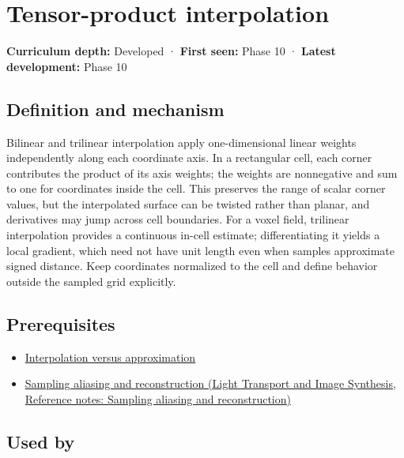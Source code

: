 \hypertarget{appendix-0a09b6dfdc86}{}\label{referencestart:appendix-0a09b6dfdc86}
\section{Tensor-product interpolation}\label{appendix-0a09b6dfdc86-tensor-product-interpolation}

\textbf{Curriculum depth:} Developed · \textbf{First seen:} Phase 10 · \textbf{Latest development:} Phase 10

\subsection{Definition and mechanism}\label{appendix-0a09b6dfdc86-definition-and-mechanism}

Bilinear and trilinear interpolation apply one-dimensional linear weights independently along each coordinate axis. In a rectangular cell, each corner contributes the product of its axis weights; the weights are nonnegative and sum to one for coordinates inside the cell. This preserves the range of scalar corner values, but the interpolated surface can be twisted rather than planar, and derivatives may jump across cell boundaries. For a voxel field, trilinear interpolation provides a continuous in-cell estimate; differentiating it yields a local gradient, which need not have unit length even when samples approximate signed distance. Keep coordinates normalized to the cell and define behavior outside the sampled grid explicitly.

\subsection{Prerequisites}\label{appendix-0a09b6dfdc86-prerequisites}

\begin{itemize}
\tightlist
\item
  \hyperref[appendix-0c2a5f69851e]{Interpolation versus approximation}
\item
  \href{../04-Light-Transport-and-Image-Synthesis/main.pdf\#nameddest=appendix-6a7869dd79a6}{Sampling aliasing and reconstruction (Light Transport and Image Synthesis, Reference notes: Sampling aliasing and reconstruction)}
\end{itemize}

\subsection{Used by}\label{appendix-0a09b6dfdc86-used-by}

